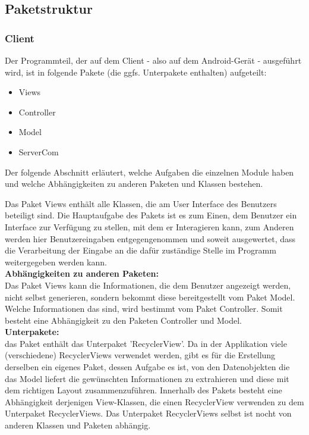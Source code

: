 \documentclass[11pt,a4paper]{report}
\begin{document}
\subsection{Paketstruktur}

\subsubsection{Client}
Der Programmteil, der auf dem Client - also auf dem Android-Gerät - ausgeführt wird, ist in folgende Pakete (die ggfs. Unterpakete enthalten) aufgeteilt:
\begin{itemize}
	\item Views
	\item Controller
	\item Model
	\item ServerCom
\end{itemize}

Der folgende Abschnitt erläutert, welche Aufgaben die einzelnen Module haben und welche Abhängigkeiten zu anderen Paketen und Klassen bestehen.

Das Paket Views enthält alle Klassen, die am User Interface des Benutzers beteiligt sind. Die Hauptaufgabe des Pakets ist es zum Einen, dem Benutzer ein Interface zur Verfügung zu stellen, mit dem er Interagieren kann, zum Anderen werden hier Benutzereingaben entgegengenommen und soweit ausgewertet, dass die Verarbeitung der Eingabe an die dafür zuständige Stelle im Programm weitergegeben werden kann.\\

\textbf{Abhängigkeiten zu anderen Paketen:}\\
Das Paket Views kann die Informationen, die dem Benutzer angezeigt werden, nicht selbst generieren, sondern bekommt diese bereitgestellt vom Paket Model. Welche Informationen das sind, wird bestimmt vom Paket Controller. Somit besteht eine Abhängigkeit zu den Paketen Controller und Model.\\

\textbf{Unterpakete:}\\
das Paket enthält das Unterpaket 'RecyclerView'. Da in der Applikation viele (verschiedene) RecyclerViews verwendet werden, gibt es für die Erstellung derselben ein eigenes Paket, dessen Aufgabe es ist, von den Datenobjekten die das Model liefert die gewünschten Informationen zu extrahieren und diese mit dem richtigen Layout zusammenzuführen. Innerhalb des Pakets besteht eine Abhängigkeit derjenigen View-Klassen, die einen RecyclerView verwenden zu dem Unterpaket RecyclerViews. Das Unterpaket RecyclerViews selbst ist nocht von anderen Klassen und Paketen abhängig.
\end{document}
